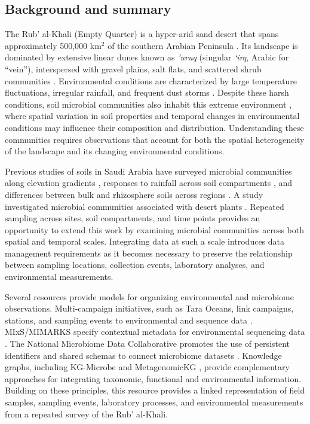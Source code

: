 \begin{revision}

\section{Background and summary}\label{intro}

The Rub' al-Khali (Empty Quarter) is a hyper-arid sand desert that spans approximately 500,000 km$^2$ of the southern Arabian Peninsula \cite{mandaville_1986}. Its landscape is dominated by extensive linear dunes known as \textit{'uruq} (singular \textit{`irq}, Arabic for ``vein''), interspersed with gravel plains, salt flats, and scattered shrub communities \cite{edgell2006arabian,mandaville_1986}. Environmental conditions are characterized by large temperature fluctuations, irregular rainfall, and frequent dust storms \cite{nelli2024wind}. Despite these harsh conditions, soil microbial communities also inhabit this extreme environment \cite{makhalanyane2015}, where spatial variation in soil properties and temporal changes in environmental conditions may influence their composition and distribution. Understanding these communities requires observations that account for both the spatial heterogeneity of the landscape and its changing environmental conditions.

Previous studies of soils in Saudi Arabia have surveyed microbial communities along elevation gradients \cite{yasir2015saudi}, responses to rainfall across soil compartments \cite{aslam2016rainfall}, and differences between bulk and rhizosphere soils across regions \cite{khan2020saudi}. A study investigated microbial communities associated with desert plants \cite{eida2018plants}. Repeated sampling across sites, soil compartments, and time points provides an opportunity to extend this work by examining microbial communities across both spatial and temporal scales. Integrating data at such a scale introduces data management requirements as it becomes necessary to preserve the relationship between sampling locations, collection events, laboratory analyses, and environmental measurements.

Several resources provide models for organizing environmental and microbiome observations. Multi-campaign initiatives, such as Tara Oceans, link campaigns, stations, and sampling events to environmental and sequence data \cite{taraoceans2015}. MIxS/MIMARKS specify contextual metadata for environmental sequencing data \cite{mixs}. The National Microbiome Data Collaborative promotes the use of persistent identifiers and shared schemas to connect microbiome datasets \cite{nmdc2026}. Knowledge graphs, including KG-Microbe \cite{kgmicrobe2026} and MetagenomicKG \cite{metagenomickg2026}, provide complementary approaches for integrating taxonomic, functional and environmental information. Building on these principles, this resource provides a linked representation of field samples, sampling events, laboratory processes, and environmental measurements from a repeated survey of the Rub' al-Khali.


\end{revision}
